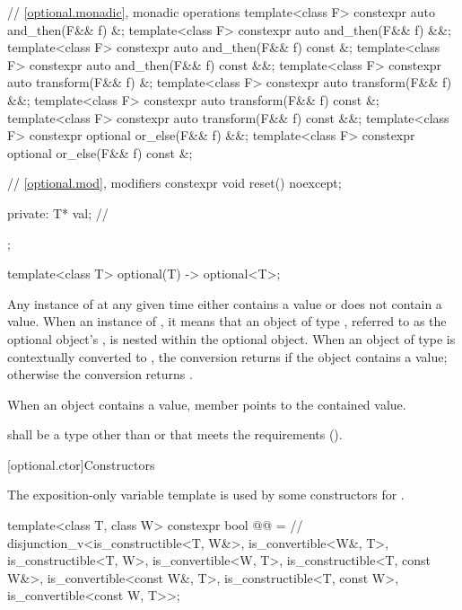 \begin{codeblock}
{{    // \ref{optional.monadic}, monadic operations
    template<class F> constexpr auto and_then(F&& f) &;
    template<class F> constexpr auto and_then(F&& f) &&;
    template<class F> constexpr auto and_then(F&& f) const &;
    template<class F> constexpr auto and_then(F&& f) const &&;
    template<class F> constexpr auto transform(F&& f) &;
    template<class F> constexpr auto transform(F&& f) &&;
    template<class F> constexpr auto transform(F&& f) const &;
    template<class F> constexpr auto transform(F&& f) const &&;
    template<class F> constexpr optional or_else(F&& f) &&;
    template<class F> constexpr optional or_else(F&& f) const &;

    // \ref{optional.mod}, modifiers
    constexpr void reset() noexcept;

  private:
    T* val;         // \expos
  };

  template<class T>
    optional(T) -> optional<T>;
}
\end{codeblock}

\pnum
Any instance of  at any given time either contains a value or does not contain a value.
When an instance of  ,
it means that an object of type , referred to as the optional object's ,
is nested within the optional object.
When an object of type  is contextually converted to ,
the conversion returns  if the object contains a value;
otherwise the conversion returns .

\pnum
When an  object contains a value,
member  points to the contained value.

\pnum
{} shall be a type
other than \cv{}  or \cv{} 
that meets the  requirements ().

[optional.ctor]{Constructors}

\pnum
The exposition-only variable template 
is used by some constructors for .
\begin{codeblock}
template<class T, class W>
constexpr bool @@ =  // \expos
  disjunction_v<is_constructible<T, W&>, is_convertible<W&, T>,
                is_constructible<T, W>, is_convertible<W, T>,
                is_constructible<T, const W&>, is_convertible<const W&, T>,
                is_constructible<T, const W>, is_convertible<const W, T>>;
\end{codeblock}

